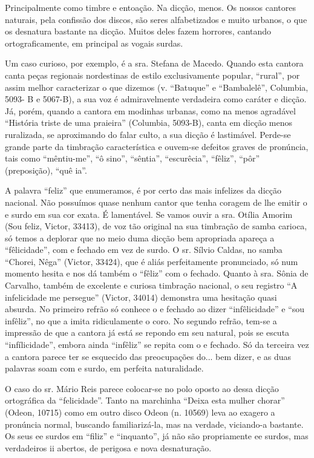Principalmente como timbre e entoação. Na dicção, menos. Os nossos
cantores naturais, pela confissão dos discos, são seres alfabetizados e
muito urbanos, o que os desnatura bastante na dicção. Muitos deles fazem
horrores, cantando ortograficamente, em principal as vogais surdas.

Um caso curioso, por exemplo, é a sra. Stefana de Macedo. Quando esta
cantora canta peças regionais nordestinas de estilo exclusivamente
popular, ``rural'', por assim melhor caracterizar o que dizemos (v.
``Batuque'' e ``Bambalelê'', Columbia, 5093- B e 5067-B), a sua voz é
admiravelmente verdadeira como caráter e dicção. Já, porém, quando a
cantora em modinhas urbanas, como na menos agradável ``História triste
de uma praieira'' (Columbia, 5093-B), canta em dicção menos ruralizada,
se aproximando do falar culto, a sua dicção é lastimável. Perde-se
grande parte da timbração característica e ouvem-se defeitos graves de
pronúncia, tais como ``mêntiu-me'', ``ô sino'', ``sêntia'',
``escurêcia'', ``fêliz'', ``pôr'' (preposição), ``quê ia''.

A palavra ``feliz'' que enumeramos, é por certo das mais infelizes da
dicção nacional. Não possuímos quase nenhum cantor que tenha coragem de
lhe emitir o e surdo em sua cor exata. É lamentável. Se vamos ouvir a
sra. Otília Amorim (Sou feliz, Victor, 33413), de voz tão original na
sua timbração de samba carioca, só temos a deplorar que no meio duma
dicção bem apropriada apareça a ``fêlicidade'', com e fechado em vez de
surdo. O sr. Sílvio Caldas, no samba ``Chorei, Nêga'' (Victor, 33424),
que é aliás perfeitamente pronunciado, só num momento hesita e nos dá
também o ``fêliz'' com o fechado. Quanto à sra. Sônia de Carvalho,
também de excelente e curiosa timbração nacional, o seu registro ``A
infelicidade me persegue'' (Victor, 34014) demonstra uma hesitação quasi
absurda. No primeiro refrão só conhece o e fechado ao dizer
``infêlicidade'' e ``sou infêliz'', no que a imita ridiculamente o coro.
No segundo refrão, tem-se a impressão de que a cantora já está se
repondo em seu natural, pois se escuta ``infílicidade'', embora ainda
``infêliz'' se repita com o e fechado. Só da terceira vez a cantora
parece ter se esquecido das preocupações do... bem dizer, e as duas
palavras soam com e surdo, em perfeita naturalidade.

O caso do sr. Mário Reis parece colocar-se no polo oposto ao dessa
dicção ortográfica da ``felicidade''. Tanto na marchinha ``Deixa esta
mulher chorar'' (Odeon, 10715) como em outro disco Odeon (n. 10569) leva
ao exagero a pronúncia normal, buscando familiarizá-la, mas na verdade,
viciando-a bastante. Os seus ee surdos em ``filiz'' e ``inquanto'', já
não são propriamente ee surdos, mas verdadeiros ii abertos, de perigosa
e nova desnaturação.


